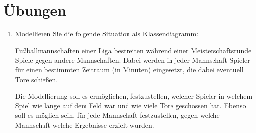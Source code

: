 \documentclass{lehramt-informatik-haupt}
\begin{document}
%

\section{Übungen}

\begin{enumerate}

%

\item Modellieren Sie die folgende Situation als Klassendiagramm:
\cite[Seite 1, Aufgae 2]{net:html:tu-dortmund:uebung-softwaretechnik}

Fußballmannschaften einer Liga bestreiten während einer
Meisterschaftsrunde Spiele gegen andere Mannschaften. Dabei werden in
jeder Mannschaft Spieler für einen bestimmten Zeitraum (in Minuten)
eingesetzt, die dabei eventuell Tore schießen.

Die Modellierung soll es ermöglichen, festzustellen, welcher Spieler in
welchem Spiel wie lange auf dem Feld war und wie viele Tore geschossen
hat. Ebenso soll es möglich sein, für jede Mannschaft festzustellen,
gegen welche Mannschaft welche Ergebnisse erzielt wurden.

\begin{center}
\end{center}

%


\end{enumerate}
\end{document}
